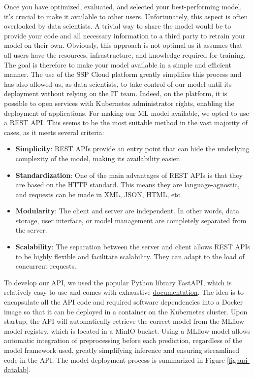 Once you have optimized, evaluated, and selected your best-performing model, it's crucial to make it available to other users. Unfortunately, this aspect is often overlooked by data scientists. A trivial way to share the model would be to provide your code and all necessary information to a third party to retrain your model on their own. Obviously, this approach is not optimal as it assumes that all users have the resources, infrastructure, and knowledge required for training. The goal is therefore to make your model available in a simple and efficient manner. The use of the SSP Cloud platform greatly simplifies this process and has also allowed us, as data scientists, to take control of our model until its deployment without relying on the IT team. Indeed, on the platform, it is possible to open services with Kubernetes administrator rights, enabling the deployment of applications. For making our ML model available, we opted to use a REST API. This seems to be the most suitable method in the vast majority of cases, as it meets several criteria:

\begin{itemize}
    \item \textbf{Simplicity}: REST APIs provide an entry point that can hide the underlying complexity of the model, making its availability easier.
    \item \textbf{Standardization}: One of the main advantages of REST APIs is that they are based on the HTTP standard. This means they are language-agnostic, and requests can be made in XML, JSON, HTML, etc.
    \item \textbf{Modularity}: The client and server are independent. In other words, data storage, user interface, or model management are completely separated from the server.
    \item \textbf{Scalability}: The separation between the server and client allows REST APIs to be highly flexible and facilitate scalability. They can adapt to the load of concurrent requests.
\end{itemize}

To develop our API, we used the popular Python library FastAPI, which is relatively easy to use and comes with exhaustive \href{https://fastapi.tiangolo.com/}{documentation}. The idea is to encapsulate all the API code and required software dependencies into a Docker image so that it can be deployed in a container on the Kubernetes cluster. Upon startup, the API will automatically retrieve the correct model from the MLflow model registry, which is located in a MinIO bucket. Using a MLflow model allows automatic integration of preprocessing before each prediction, regardless of the model framework used, greatly simplifying inference and ensuring streamlined code in the API. The model deployment process is summarized in Figure \ref{fig:api-datalab}.

